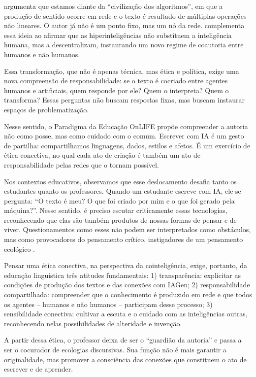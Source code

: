 \documentclass[portuguese]{textolivre}
\begin{document}
\textcite{accoto2020mundodado} argumenta que estamos diante da “civilização dos algoritmos”, em que a produção de sentido ocorre em rede e o texto é resultado de múltiplas operações não lineares. O autor já não é um ponto fixo, mas um nó da rede. \textcite{difelice2023depoisdonatural} complementa essa ideia ao afirmar que as hiperinteligências não substituem a inteligência humana, mas a descentralizam, instaurando um novo regime de coautoria entre humanos e não humanos.

Essa transformação, que não é apenas técnica, mas ética e política, exige uma nova compreensão de responsabilidade: se o texto é cocriado entre agentes humanos e artificiais, quem responde por ele? Quem o interpreta? Quem o transforma? Essas perguntas não buscam respostas fixas, mas buscam instaurar espaços de problematização.

Nesse sentido, o Paradigma da Educação OnLIFE propõe compreender a autoria não como posse, mas como cuidado com o comum. Escrever com IA é um gesto de partilha: compartilhamos linguagens, dados, estilos e afetos. É um exercício de ética conectiva, no qual cada ato de criação é também um ato de responsabilidade pelas redes que o tornam possível.

Nos contextos educativos, observamos que esse deslocamento desafia tanto os estudantes quanto os professores. Quando um estudante escreve com IA, ele se pergunta: “O texto é meu? O que foi criado por mim e o que foi gerado pela máquina?”. Nesse sentido, é preciso escutar criticamente essas tecnologias, reconhecendo que elas são também produtos de nossas formas de pensar e de viver. Questionamentos como esses não podem ser interpretados como obstáculos, mas como provocadores do pensamento crítico, instigadores de um pensamento ecológico \cite{morton2018beingecological}.

Pensar uma ética conectiva, na perspectiva da cointeligência, exige, portanto, da educação linguística três atitudes fundamentais: 1) transparência: explicitar as condições de produção dos textos e das conexões com IAGen; 2) responsabilidade compartilhada: compreender que o conhecimento é produzido em rede e que todos os agentes – humanos e não humanos – participam desse processo; 3) sensibilidade conectiva: cultivar a escuta e o cuidado com as inteligências outras, reconhecendo nelas possibilidades de alteridade e invenção.

A partir dessa ética, o professor deixa de ser o “guardião da autoria” e passa a ser o cocurador de ecologias discursivas. Sua função não é mais garantir a originalidade, mas promover a consciência das conexões que constituem o ato de escrever e de aprender.
\end{document}

